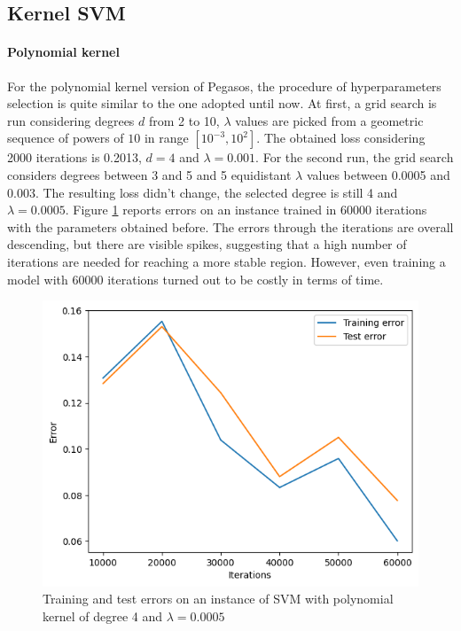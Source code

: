 \documentclass{article}
\begin{document}
\subsection{Kernel SVM}

\paragraph{Polynomial kernel}
For the polynomial kernel version of Pegasos, the procedure of hyperparameters selection is quite similar to the one adopted until now. At first, a grid search is run considering degrees $d$ from 2 to 10, $\lambda$ values are picked from a geometric sequence of powers of $10$ in range $[10^{-3}, 10^2]$. The obtained loss considering 2000 iterations is 0.2013, $d=4$ and $\lambda=0.001$. For the second run, the grid search considers degrees between 3 and 5 and 5 equidistant $\lambda$ values between 0.0005 and 0.003. The resulting loss didn't change, the selected degree is still 4 and $\lambda=0.0005$. Figure \ref{fig:kpoly_svm.png} reports errors on an instance trained in 60000 iterations with the parameters obtained before. The errors through the iterations are overall descending, but there are visible spikes, suggesting that a high number of iterations are needed for reaching a more stable region. However, even training a model with 60000 iterations turned out to be costly in terms of time.

\begin{figure}
	\centering
	\includegraphics[width=0.6\columnwidth]{../plots/kpoly_svm.png}
	\caption{Training and test errors on an instance of SVM with polynomial kernel of degree 4 and $\lambda=0.0005$}
	\label{fig:kpoly_svm.png}
\end{figure}
\end{document}
